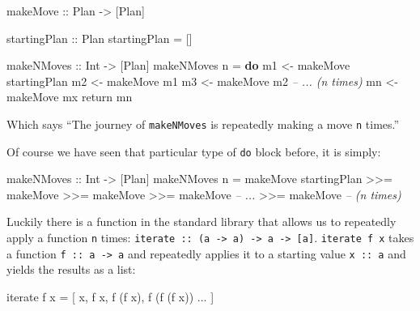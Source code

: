 \documentclass[]{article}
\newenvironment{Shaded}{}{}
\newcommand{\KeywordTok}[1]{\textcolor[rgb]{0.00,0.44,0.13}{\textbf{{#1}}}}
\newcommand{\DataTypeTok}[1]{\textcolor[rgb]{0.56,0.13,0.00}{{#1}}}
\newcommand{\CommentTok}[1]{\textcolor[rgb]{0.38,0.63,0.69}{\textit{{#1}}}}
\newcommand{\OtherTok}[1]{\textcolor[rgb]{0.00,0.44,0.13}{{#1}}}
\newcommand{\FunctionTok}[1]{\textcolor[rgb]{0.02,0.16,0.49}{{#1}}}
\newcommand{\NormalTok}[1]{{#1}}
\begin{document}
\begin{Shaded}
\begin{Highlighting}[]
\OtherTok{makeMove ::} \DataTypeTok{Plan} \OtherTok{->} \NormalTok{[}\DataTypeTok{Plan}\NormalTok{]}

\OtherTok{startingPlan ::} \DataTypeTok{Plan}
\NormalTok{startingPlan }\FunctionTok{=} \NormalTok{[]}

\OtherTok{makeNMoves ::} \DataTypeTok{Int} \OtherTok{->} \NormalTok{[}\DataTypeTok{Plan}\NormalTok{]}
\NormalTok{makeNMoves n }\FunctionTok{=} \KeywordTok{do}
    \NormalTok{m1 }\OtherTok{<-} \NormalTok{makeMove startingPlan}
    \NormalTok{m2 }\OtherTok{<-} \NormalTok{makeMove m1}
    \NormalTok{m3 }\OtherTok{<-} \NormalTok{makeMove m2}
    \CommentTok{-- ... (n times)}
    \NormalTok{mn }\OtherTok{<-} \NormalTok{makeMove mx}
    \NormalTok{return mn}
\end{Highlighting}
\end{Shaded}

Which says ``The journey of \texttt{makeNMoves} is repeatedly making a
move \texttt{n} times.''

Of course we have seen that particular type of \texttt{do} block before,
it is simply:

\begin{Shaded}
\begin{Highlighting}[]
\OtherTok{makeNMoves ::} \DataTypeTok{Int} \OtherTok{->} \NormalTok{[}\DataTypeTok{Plan}\NormalTok{]}
\NormalTok{makeNMoves n }\FunctionTok{=}
    \NormalTok{makeMove startingPlan }\FunctionTok{>>=} \NormalTok{makeMove}
        \FunctionTok{>>=} \NormalTok{makeMove }\FunctionTok{>>=} \NormalTok{makeMove   }\CommentTok{-- ...}
        \FunctionTok{>>=} \NormalTok{makeMove                }\CommentTok{-- (n times)}
\end{Highlighting}
\end{Shaded}

Luckily there is a function in the standard library that allows us to
repeatedly apply a function \texttt{n} times:
\texttt{iterate\ ::\ (a\ -\textgreater{}\ a)\ -\textgreater{}\ a\ -\textgreater{}\ {[}a{]}}.
\texttt{iterate\ f\ x} takes a function
\texttt{f\ ::\ a\ -\textgreater{}\ a} and repeatedly applies it to a
starting value \texttt{x\ ::\ a} and yields the results as a list:

\begin{Shaded}
\begin{Highlighting}[]
\NormalTok{iterate f x }\FunctionTok{=} \NormalTok{[ x, f x, f (f x), f (f (f x)) }\FunctionTok{...} \NormalTok{]}
\end{Highlighting}
\end{Shaded}
\end{document}

